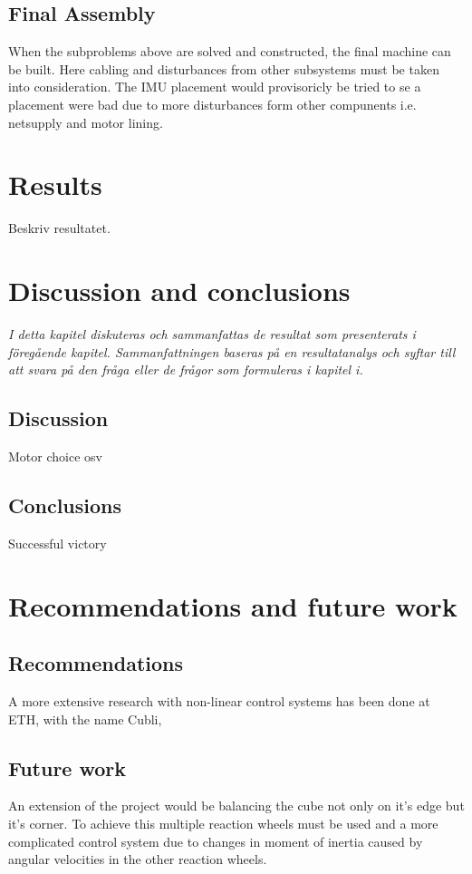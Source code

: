 \documentclass[a4paper,11pt]{kth-mag}
\begin{document}
\section{Final Assembly}
When the subproblems above are solved and constructed, the final machine can be built. Here cabling and disturbances from other subsystems must be taken into consideration. 
The IMU placement would provisoricly be tried to se a placement were bad due to more disturbances form other compunents i.e. netsupply and motor lining.

\chapter{Results}
Beskriv resultatet. 

\chapter{Discussion and conclusions}
\emph{I detta kapitel diskuteras och sammanfattas de resultat som presenterats i föregående kapitel. Sammanfattningen baseras på en resultatanalys och syftar till att svara på den fråga eller de frågor som formuleras i kapitel i.}

\section{Discussion}
Motor choice osv

\section{Conclusions}
Successful victory


\chapter{Recommendations and future work}

\section{Recommendations}
A more extensive research with non-linear control systems has been done at ETH, with the name Cubli,\cite{cubliECC13}

\section{Future work}
An extension of the project would be balancing the cube not only on it's edge but it's corner. To achieve this multiple reaction wheels must be used and a more complicated control system due to changes in moment of inertia caused by angular velocities in the other reaction wheels.
\end{document}
